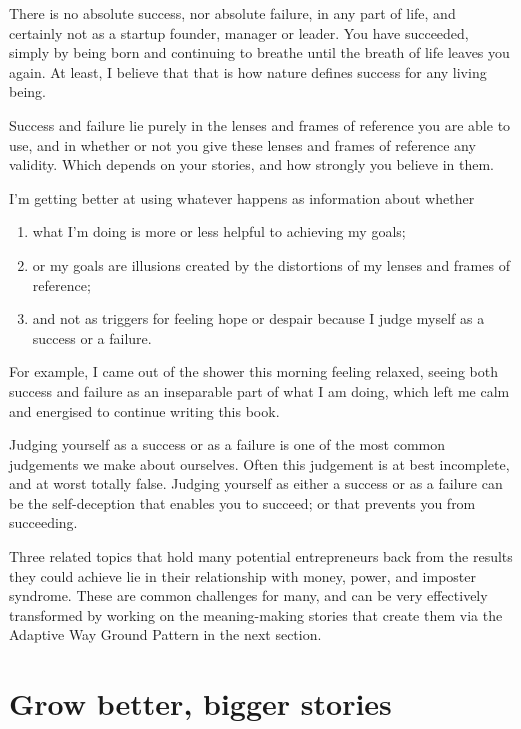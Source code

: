 There is no absolute success, nor absolute failure, in any part of life, and certainly not as a startup founder, manager or leader. You have succeeded, simply by being born and continuing to breathe until the breath of life leaves you again. At least, I believe that that is how nature defines success for any living being. 


Success and failure lie purely in the lenses and frames of reference you are able to use, and in whether or not you give these lenses and frames of reference any validity. Which depends on your stories, and how strongly you believe in them.


I’m getting better at using whatever happens as information about whether


\begin{enumerate}
\item what I’m doing is more or less helpful to achieving my goals;
\item or my goals are illusions created by the distortions of my lenses and frames of reference;
\item and not as triggers for feeling hope or despair because I judge myself as a success or a failure.
\end{enumerate}


For example, I came out of the shower this morning feeling relaxed, seeing both success and failure as an inseparable part of what I am doing, which left me calm and energised to continue writing this book. 


Judging yourself as a success or as a failure is one of the most common judgements we make about ourselves. Often this judgement is at best incomplete, and at worst totally false. Judging yourself as either a success or as a failure can be the self-deception that enables you to succeed; or that prevents you from succeeding. 


Three related topics that hold many potential entrepreneurs back from the results they could achieve lie in their relationship with money\cite{dellner-money, twist-money},  power\cite{kahane-power-and-love}, and imposter syndrome. These are common challenges for many, and can be very effectively transformed by working on the meaning-making stories that create them via the Adaptive Way Ground Pattern in the next section.
\section{Grow better, bigger stories}
\label{section:ground-pattern}


